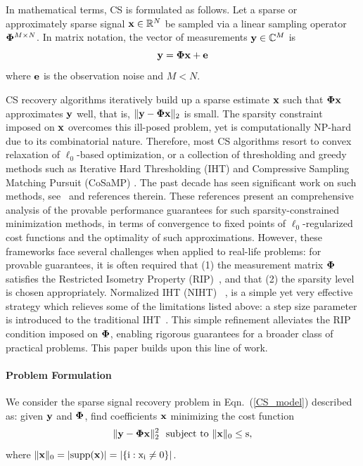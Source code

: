 \documentclass{article}
\begin{document}
In mathematical terms, CS is formulated as follows. Let a sparse or approximately sparse signal ${\bf x}\in \mathbb{R}^N$ be sampled via a linear sampling operator ${\bf \Phi}^{M\times N}$. In matrix notation, the vector of measurements ${\bf y} \in \mathbb{C}^M$ is
\begin{equation}\label{CS_model}
 {\bf y} =  {\bf \Phi}  {\bf x} + {\bf e}
\end{equation}
where ${\bf e}$ is the observation noise and $M < N$.

CS recovery algorithms iteratively build up a sparse estimate ${\bf x}$ such that ${\bf \Phi}  {\bf x}$ approximates ${\bf y}$ well, that is,  $\| {\bf y}- {\bf \Phi}  {\bf x} \|_2$ is small. The sparsity constraint imposed on ${\bf x}$ overcomes this ill-posed problem, yet is computationally NP-hard due to its combinatorial nature. 
Therefore, most CS algorithms resort to convex relaxation of $\ell_0$-based optimization, or a collection of thresholding and greedy methods such as Iterative Hard Thresholding (IHT) \cite{blumensath2008iht, blumensath2009iht} and Compressive Sampling Matching Pursuit (CoSaMP) \cite{needel2008cosamp}. The past decade has seen significant work on such methods, see~\cite{liu2017dualiht, yuan2014ht, yuan2016htp, blumensath2013cs, needel2008cosamp} and references therein. These references present an comprehensive analysis of the provable performance guarantees for such sparsity-constrained minimization methods, in terms of convergence to fixed points of $\ell_0$-regularized cost functions and the optimality of such approximations. However, these frameworks face several challenges when applied to real-life problems: for provable guarantees, it is often required that (1) the measurement matrix ${\bf \Phi}$ satisfies the Restricted Isometry Property (RIP)~\cite{candes2008rip, chartrand2008rip}, and that (2) the sparsity level is chosen appropriately. 
Normalized IHT (NIHT)~ \cite{blumensath2010niht}, is a simple yet very effective strategy  which relieves some of the limitations listed above: a step size parameter is introduced to the traditional IHT~\cite{blumensath2008iht}. This simple refinement alleviates the RIP condition imposed on ${\bf \Phi}$, enabling rigorous guarantees for a broader class of practical problems. {This paper
builds upon this line of work.}

\vspace{-1em}
\paragraph*{Problem Formulation}
 We consider the sparse signal recovery problem in Eqn.~(\ref{CS_model}) described as: given ${\bf y}$ and ${\bf \Phi}$, find coefficients ${\bf x}$ minimizing the cost function
 \begin{equation}\label{cost_function}
     \|{\bf y} - {\bf \Phi x} \|_2^2 \ \ \rm{subject \ to \ \|{\bf x} \|_0 \leq s},
 \end{equation}
 where $\|{\bf x} \|_0 = |\rm{supp}({\bf x})| = |\{i: x_i\neq 0 \}|$.
 
\end{document}
